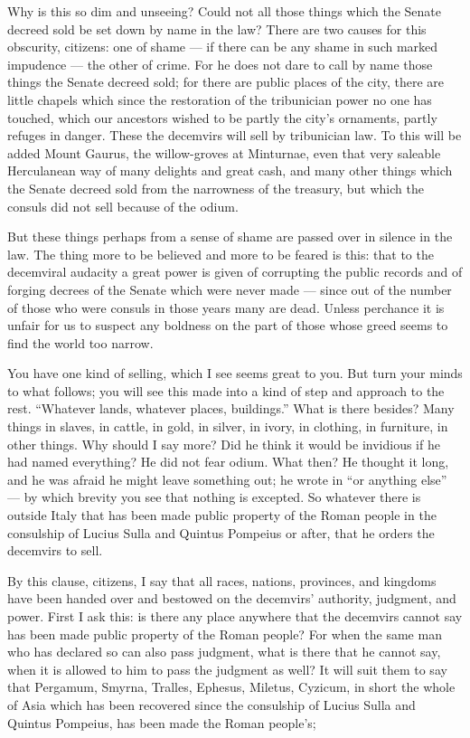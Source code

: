  Why is this so dim and unseeing? Could not all those things which the Senate decreed sold be set down by name in the law? There are two causes for this obscurity, citizens: one of shame --- if there can be any shame in such marked impudence --- the other of crime. For he does not dare to call by name those things the Senate decreed sold; for there are public places of the city, there are little chapels which since the restoration of the tribunician power no one has touched, which our ancestors wished to be partly the city's ornaments, partly refuges in danger. These the decemvirs will sell by tribunician law. To this will be added Mount Gaurus, the willow-groves at Minturnae, even that very saleable Herculanean way of many delights and great cash, and many other things which the Senate decreed sold from the narrowness of the treasury, but which the consuls did not sell because of the odium.

 But these things perhaps from a sense of shame are passed over in silence in the law. The thing more to be believed and more to be feared is this: that to the decemviral audacity a great power is given of corrupting the public records and of forging decrees of the Senate which were never made --- since out of the number of those who were consuls in those years many are dead. Unless perchance it is unfair for us to suspect any boldness on the part of those whose greed seems to find the world too narrow.

 You have one kind of selling, which I see seems great to you. But turn your minds to what follows; you will see this made into a kind of step and approach to the rest. ``Whatever lands, whatever places, buildings.'' What is there besides? Many things in slaves, in cattle, in gold, in silver, in ivory, in clothing, in furniture, in other things. Why should I say more? Did he think it would be invidious if he had named everything? He did not fear odium. What then? He thought it long, and he was afraid he might leave something out; he wrote in ``or anything else'' --- by which brevity you see that nothing is excepted. So whatever there is outside Italy that has been made public property of the Roman people in the consulship of Lucius Sulla and Quintus Pompeius or after, that he orders the decemvirs to sell.

 By this clause, citizens, I say that all races, nations, provinces, and kingdoms have been handed over and bestowed on the decemvirs' authority, judgment, and power. First I ask this: is there any place anywhere that the decemvirs cannot say has been made public property of the Roman people? For when the same man who has declared so can also pass judgment, what is there that he cannot say, when it is allowed to him to pass the judgment as well? It will suit them to say that Pergamum, Smyrna, Tralles, Ephesus, Miletus, Cyzicum, in short the whole of Asia which has been recovered since the consulship of Lucius Sulla and Quintus Pompeius, has been made the Roman people's;

